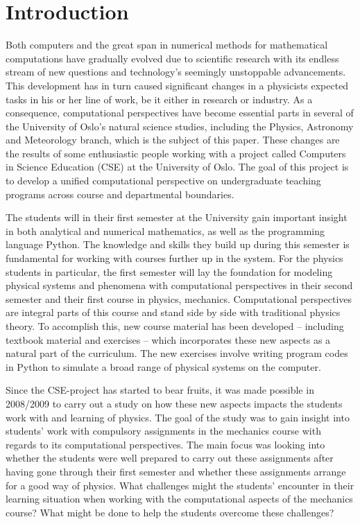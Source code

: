 \documentclass[aps,prb,floatfix,twocolumn,twoside,english]{revtex4-1}
\begin{document}
\section{Introduction}

Both computers and the great span in numerical methods for mathematical computations have gradually evolved due to scientific research with its endless stream of new questions and technology's seemingly unstoppable advancements. This development has in turn caused significant changes in a physicists expected tasks in his or her line of work, be it either in research or industry. As a consequence, computational perspectives have become essential parts in several of the University of Oslo's natural science studies, including the Physics, Astronomy and Meteorology branch, which is the subject of this paper. These changes are the results of some enthusiastic people working with a project called Computers in Science Education (CSE) at the University of Oslo.\cite{CMACSE} The goal of this project is to develop a unified computational perspective on undergraduate teaching programs across course and departmental boundaries.

The students will in their first semester at the University gain important insight in both analytical and numerical mathematics, as well as the programming language Python. The knowledge and skills they build up during this semester is fundamental for working with courses further up in the system. For the physics students in particular, the first semester will lay the foundation for modeling physical systems and phenomena with computational perspectives in their second semester and their first course in physics, mechanics. Computational perspectives are integral parts of this course and stand side by side with traditional physics theory. To accomplish this, new course material has been developed -- including textbook material and exercises -- which incorporates these new aspects as a natural part of the curriculum. The new exercises involve writing program codes in Python to simulate a broad range of physical systems on the computer. 

Since the CSE-project has started to bear fruits, it was made possible in 2008/2009 to carry out a study on how these new aspects impacts the students work with and learning of physics. The goal of the study was to gain insight into students' work with compulsory assignments in the mechanics course with regards to its computational perspectives. The main focus was looking into whether the students were well prepared to carry out these assignments after having gone through their first semester and whether these assignments arrange for a good way of physics. What challenges might the students' encounter in their learning situation when working with the computational aspects of the mechanics course? What might be done to help the students overcome these challenges?
\end{document}
